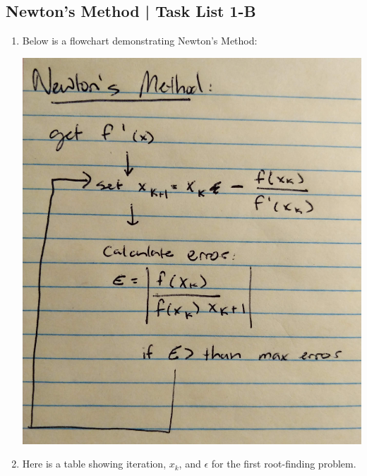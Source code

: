 \documentclass[12pt]{extarticle}
\begin{document}
\subsection{Newton's Method | Task List 1-B}
\begin{enumerate}
\item Below is a flowchart demonstrating Newton's Method:
\begin{center}
\includegraphics[width = .6\textwidth]{pic_4}
\end{center}
\item Here is a table showing iteration, $x_k$, and $\epsilon$ for the first root-finding problem.


\end{enumerate}
\end{document}
